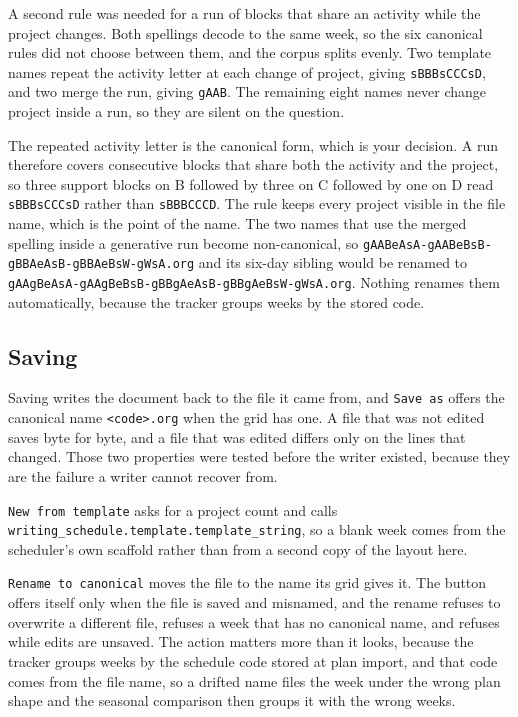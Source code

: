 \documentclass[11pt]{article}
\begin{document}
A second rule was needed for a run of blocks that share an activity while the
project changes. Both spellings decode to the same week, so the six canonical
rules did not choose between them, and the corpus splits evenly. Two template
names repeat the activity letter at each change of project, giving
\texttt{sBBBsCCCsD}, and two merge the run, giving \texttt{gAAB}. The remaining eight names
never change project inside a run, so they are silent on the question.

The repeated activity letter is the canonical form, which is your decision. A
run therefore covers consecutive blocks that share both the activity and the
project, so three support blocks on B followed by three on C followed by one on
D read \texttt{sBBBsCCCsD} rather than \texttt{sBBBCCCD}. The rule keeps every project visible
in the file name, which is the point of the name. The two names that use the
merged spelling inside a generative run become non-canonical, so
\texttt{gAABeAsA-gAABeBsB-gBBAeAsB-gBBAeBsW-gWsA.org} and its six-day sibling would be
renamed to \texttt{gAAgBeAsA-gAAgBeBsB-gBBgAeAsB-gBBgAeBsW-gWsA.org}. Nothing renames
them automatically, because the tracker groups weeks by the stored code.
\subsection{Saving}
\label{sec:orgfd7669a}

Saving writes the document back to the file it came from, and \texttt{Save as} offers
the canonical name \texttt{<code>.org} when the grid has one. A file that was not edited
saves byte for byte, and a file that was edited differs only on the lines that
changed. Those two properties were tested before the writer existed, because
they are the failure a writer cannot recover from.

\texttt{New from template} asks for a project count and calls
\texttt{writing\_schedule.template.template\_string}, so a blank week comes from the
scheduler's own scaffold rather than from a second copy of the layout here.

\texttt{Rename to canonical} moves the file to the name its grid gives it. The button
offers itself only when the file is saved and misnamed, and the rename refuses
to overwrite a different file, refuses a week that has no canonical name, and
refuses while edits are unsaved. The action matters more than it looks, because
the tracker groups weeks by the schedule code stored at plan import, and that
code comes from the file name, so a drifted name files the week under the wrong
plan shape and the seasonal comparison then groups it with the wrong weeks.
\end{document}
